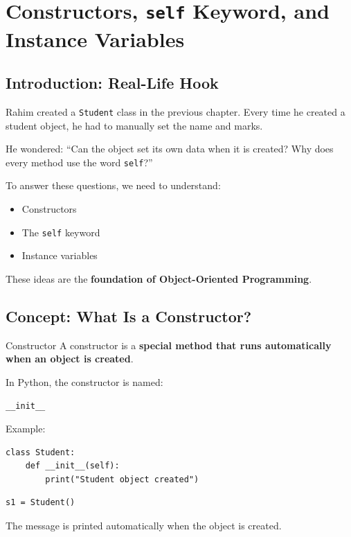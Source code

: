 \chapter{Constructors, \texttt{self} Keyword, and Instance Variables}

\section{Introduction: Real-Life Hook}

Rahim created a \texttt{Student} class in the previous chapter.
Every time he created a student object, he had to manually set the name and marks.

He wondered:
``Can the object set its own data when it is created?  
Why does every method use the word \texttt{self}?''

To answer these questions, we need to understand:
\begin{itemize}
    \item Constructors
    \item The \texttt{self} keyword
    \item Instance variables
\end{itemize}

These ideas are the \textbf{foundation of Object-Oriented Programming}.

\section{Concept: What Is a Constructor?}

\begin{definition}{Constructor}
A constructor is a \textbf{special method that runs automatically when an object is created}.
\end{definition}

In Python, the constructor is named:

\begin{center}
\texttt{\_\_init\_\_}
\end{center}

Example:
\begin{verbatim}
class Student:
    def __init__(self):
        print("Student object created")
\end{verbatim}

\begin{verbatim}
s1 = Student()
\end{verbatim}

The message is printed automatically when the object is created.

